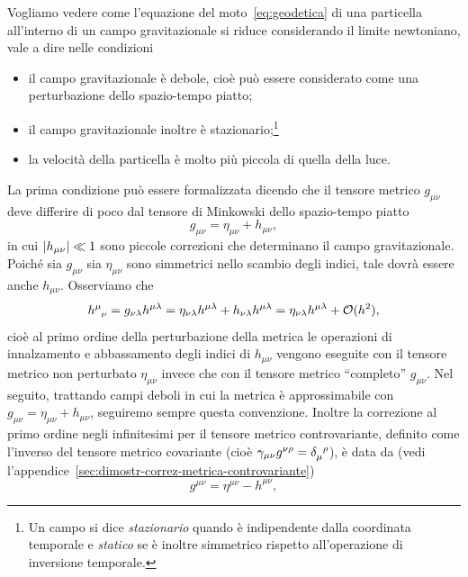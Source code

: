 Vogliamo vedere come l'equazione del moto~\eqref{eq:geodetica} di una particella
all'interno di un campo gravitazionale si riduce considerando il limite
newtoniano, vale a dire nelle condizioni
\begin{itemize}
\item il campo gravitazionale è debole, cioè può essere considerato come una
  perturbazione dello spazio-tempo piatto;
\item il campo gravitazionale inoltre è stazionario;\footnote{Un campo si dice
    \emph{stazionario} quando è indipendente dalla coordinata temporale e
    \emph{statico} se è inoltre simmetrico rispetto all'operazione di inversione
    temporale.}
\item la velocità della particella è molto più piccola di quella della luce.
\end{itemize}
La prima condizione può essere formalizzata dicendo che il
tensore metrico $g_{\mu\nu}$ deve differire di poco dal
tensore di Minkowski dello spazio-tempo piatto
\begin{equation}
  g_{\mu\nu} = \eta_{\mu\nu} + h_{\mu\nu},
\end{equation}
in cui $\lvert h_{\mu\nu}\rvert \ll 1$ sono piccole correzioni che determinano il campo
gravitazionale.  Poiché sia $g_{\mu\nu}$ sia $\eta_{\mu\nu}$ sono simmetrici
nello scambio degli indici, tale dovrà essere anche $h_{\mu\nu}$.  Osserviamo
che
\begin{equation}
  \tensor{h}{^{\mu}_{\nu}} = g_{\nu\lambda}h^{\mu\lambda} =
  \eta_{\nu\lambda}h^{\mu\lambda} + h_{\nu\lambda}h^{\mu\lambda} =
  \eta_{\nu\lambda}h^{\mu\lambda} + \mathcal{O}(h^{2}),
\end{equation}
cioè al primo ordine della perturbazione della metrica le operazioni di
innalzamento e abbassamento degli indici di $h_{\mu\nu}$ vengono eseguite con il
tensore metrico non perturbato $\eta_{\mu\nu}$ invece che con il tensore metrico
``completo'' $g_{\mu\nu}$.  Nel seguito, trattando campi deboli in cui la
metrica è approssimabile con $g_{\mu\nu} = \eta_{\mu\nu} + h_{\mu\nu}$,
seguiremo sempre questa convenzione.  Inoltre la correzione al primo ordine
negli infinitesimi per il tensore metrico controvariante, definito come
l'inverso del tensore metrico covariante (cioè $\gamma_{\mu\nu}g^{\nu\rho} =
\tensor{\delta}{_{\mu}^{\rho}}$), è data da (vedi
l'appendice~\ref{sec:dimostr-correz-metrica-controvariante})
\begin{equation}
  \label{eq:correzione-metrica-controvariante}
  g^{\mu\nu} = \eta^{\mu\nu} - h^{\mu\nu},
\end{equation}

